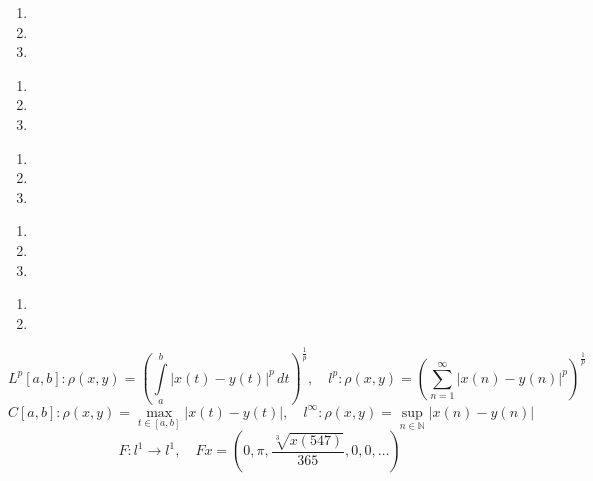 \documentclass[12pt]{article}
\newtheorem{problem}{\hskip\parindent Задача}%
\begin{document}
\begin{problem}
\end{problem}
\begin{enumerate}
	\item
	\item
	\item
\end{enumerate}
\begin{problem}
\end{problem}
\begin{enumerate}
	\item
	\item
	\item
\end{enumerate}
\begin{problem}
\end{problem}
\begin{enumerate}
	\item
	\item
	\item
\end{enumerate}
\begin{problem}
\end{problem}
	\begin{enumerate}
	\item
	\item
	\item
\end{enumerate}
\begin{problem}
\end{problem}
\begin{enumerate}
	\item
	\item
\end{enumerate}
\begin{equation*}
	L^p[a,b]:  \rho(x,y)=\left(\int\limits_{a}^{b}|x(t)-y(t)|^p\,dt\right)^{\frac{1}{p}}, \quad l^p: \rho(x,y)=\left(\sum\limits_{n=1}^{\infty}|x(n)-y(n)|^p\right)^{\frac{1}{p}}
\end{equation*}
\begin{equation*}
	C[a,b]: \rho(x,y)=\max\limits_{t\in[a,b]}|x(t)-y(t)|, \quad l^{\infty}: \rho(x,y)=\sup\limits_{n\in\mathbb{N}}\left|x(n)-y(n)\right|
\end{equation*}
\begin{equation*}
	F:l^1\to l^1, \quad Fx=\left(0,\pi,\frac{\sqrt[3]{x(547)}}{365},0,0,\dots\right)
\end{equation*}
\end{document}
